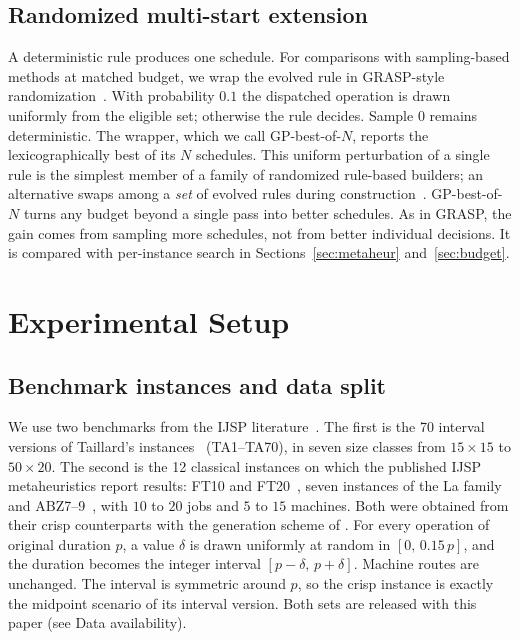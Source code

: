\documentclass[preprint,number,sort&compress,12pt]{elsarticle}
\begin{document}
\subsection{Randomized multi-start extension}
\label{sec:grasp}
A deterministic rule produces one schedule. For comparisons with
sampling-based methods at matched budget, we wrap the evolved rule in
GRASP-style randomization~\citep{Feo1995}. With probability $0.1$ the
dispatched operation is drawn uniformly from the eligible set; otherwise
the rule decides. Sample $0$ remains deterministic. The wrapper, which
we call GP-best-of-$N$, reports the lexicographically best of its $N$
schedules. This uniform perturbation of a single rule is the simplest
member of a family of randomized rule-based builders; an alternative
swaps among a \emph{set} of evolved rules during
construction~\citep{GilGala2025GRASB}. GP-best-of-$N$ turns any budget
beyond a single pass into better schedules. As in GRASP, the gain comes
from sampling more schedules, not from better individual decisions. It
is compared with per-instance search in Sections~\ref{sec:metaheur}
and~\ref{sec:budget}.

\section{Experimental Setup}
\label{sec:setup}

\subsection{Benchmark instances and data split}
\label{sec:instances}
We use two benchmarks from the IJSP
literature~\citep{DiazGA2020,DiazFEABC2023,DiazICAE2023}. The first is
the 70 interval versions of Taillard's instances~\citep{Taillard1993}
(TA1--TA70), in seven size classes from $15{\times}15$ to $50{\times}20$.
The second is the 12 classical instances on which the published IJSP
metaheuristics report results: FT10 and FT20~\citep{FisherThompson1963},
seven instances of the La family~\citep{Lawrence1984} and
ABZ7--9~\citep{Adams1988}, with $10$ to $20$ jobs and $5$ to $15$
machines. Both were obtained from their crisp counterparts with the
generation scheme of \citet{DiazGA2020}. For every operation of original
duration $p$, a value $\delta$ is drawn uniformly at random in
$[0,\, 0.15\,p]$, and the duration becomes the integer interval
$[p-\delta,\, p+\delta]$. Machine routes are unchanged. The interval is
symmetric around $p$, so the crisp instance is exactly the midpoint
scenario of its interval version. Both sets are released with this
paper (see Data availability).
\end{document}
